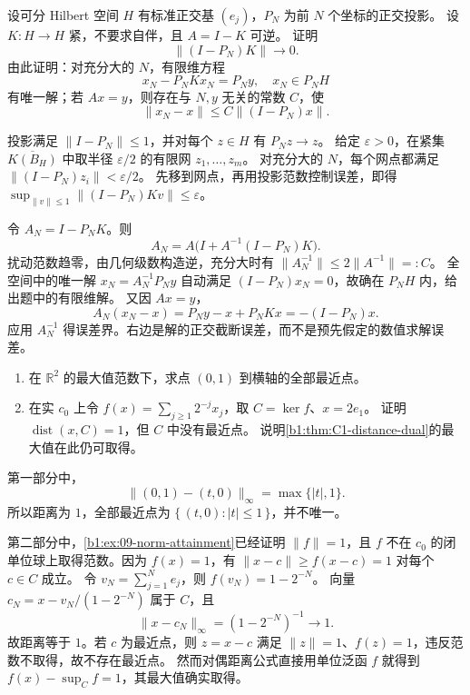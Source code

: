 \begin{exercise}\label{b1:ex:C1-galerkin}
设可分 Hilbert 空间 \(H\) 有标准正交基 \((e_j)\)，\(P_N\) 为前 \(N\) 个坐标的正交投影。
设 \(K:H\rightarrow H\) 紧，不要求自伴，且 \(A=I-K\) 可逆。
证明
\[
 \|(I-P_N)K\|\longrightarrow0.
\]
由此证明：对充分大的 \(N\)，有限维方程
\[
 x_N-P_NKx_N=P_Ny,\quad x_N\in P_NH
\]
有唯一解；若 \(Ax=y\)，则存在与 \(N,y\) 无关的常数 \(C\)，使
\[
 \|x_N-x\|\leq C\|(I-P_N)x\|.
\]
\end{exercise}
\begin{solution}
投影满足 \(\|I-P_N\|\leq1\)，并对每个 \(z\in H\) 有 \(P_Nz\to z\)。
给定 \(\varepsilon>0\)，在紧集 \(\overline{K(B_H)}\) 中取半径
\(\varepsilon/2\) 的有限网 \(z_1,\ldots,z_m\)。
对充分大的 \(N\)，每个网点都满足
\(\|(I-P_N)z_i\|<\varepsilon/2\)。
先移到网点，再用投影范数控制误差，即得
\(\sup_{\|v\|\leq1}\|(I-P_N)Kv\|\leq\varepsilon\)。

令 \(A_N=I-P_NK\)。则
\[
 A_N=A\bigl(I+A^{-1}(I-P_N)K\bigr).
\]
扰动范数趋零，由几何级数构造逆，充分大时有
\(\|A_N^{-1}\|\leq2\|A^{-1}\|=:C\)。
全空间中的唯一解 \(x_N=A_N^{-1}P_Ny\) 自动满足
\((I-P_N)x_N=0\)，故确在 \(P_NH\) 内，给出题中的有限维解。
又因 \(Ax=y\)，
\[
 A_N(x_N-x)=P_Ny-x+P_NKx=-(I-P_N)x.
\]
应用 \(A_N^{-1}\) 得误差界。右边是解的正交截断误差，而不是预先假定的数值求解误差。
\end{solution}

\begin{exercise}\label{b1:ex:C1-dual-maximum-no-nearest}
\begin{enumerate}
\item\label{b1:item:C1-nonunique-nearest}
在 \(\mathbb R^2\) 的最大值范数下，求点 \((0,1)\) 到横轴的全部最近点。
\item\label{b1:item:C1-no-nearest}
在实 \(c_0\) 上令 \(f(x)=\sum_{j\geq1}2^{-j}x_j\)，取 \(C=\ker f\)、\(x=2e_1\)。
证明 \(\operatorname{dist}(x,C)=1\)，但 \(C\) 中没有最近点。
说明\cref{b1:thm:C1-distance-dual}的最大值在此仍可取得。
\end{enumerate}
\end{exercise}
\begin{solution}
第一部分中，
\[
 \|(0,1)-(t,0)\|_\infty=\max\{|t|,1\}.
\]
所以距离为 \(1\)，全部最近点为 \(\{\,(t,0):|t|\leq1\,\}\)，并不唯一。

第二部分中，\cref{b1:ex:09-norm-attainment}已经证明 \(\|f\|=1\)，且
\(f\) 不在 \(c_0\) 的闭单位球上取得范数。因为 \(f(x)=1\)，有
\(\|x-c\|\geq f(x-c)=1\) 对每个 \(c\in C\) 成立。
令 \(v_N=\sum_{j=1}^Ne_j\)，则 \(f(v_N)=1-2^{-N}\)。
向量 \(c_N=x-v_N/(1-2^{-N})\) 属于 \(C\)，且
\[
 \|x-c_N\|_\infty=(1-2^{-N})^{-1}\longrightarrow1.
\]
故距离等于 \(1\)。若 \(c\) 为最近点，则 \(z=x-c\) 满足
\(\|z\|=1\)、\(f(z)=1\)，违反范数不取得，故不存在最近点。
然而对偶距离公式直接用单位泛函 \(f\) 就得到
\(f(x)-\sup_Cf=1\)，其最大值确实取得。
\end{solution}

